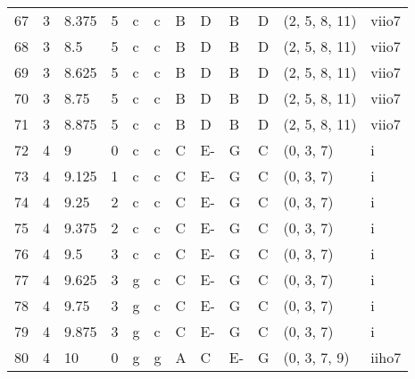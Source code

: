 \begin{tabular}{llllllllllll}
67  & 3       & 8.375  & 5               & c          & c              & B      & D       & B      & D         & (2, 5, 8, 11)    & viio7          \\
68  & 3       & 8.5    & 5               & c          & c              & B      & D       & B      & D         & (2, 5, 8, 11)    & viio7          \\
69  & 3       & 8.625  & 5               & c          & c              & B      & D       & B      & D         & (2, 5, 8, 11)    & viio7          \\
70  & 3       & 8.75   & 5               & c          & c              & B      & D       & B      & D         & (2, 5, 8, 11)    & viio7          \\
71  & 3       & 8.875  & 5               & c          & c              & B      & D       & B      & D         & (2, 5, 8, 11)    & viio7          \\
72  & 4       & 9      & 0               & c          & c              & C      & E-      & G      & C         & (0, 3, 7)        & i              \\
73  & 4       & 9.125  & 1               & c          & c              & C      & E-      & G      & C         & (0, 3, 7)        & i              \\
74  & 4       & 9.25   & 2               & c          & c              & C      & E-      & G      & C         & (0, 3, 7)        & i              \\
75  & 4       & 9.375  & 2               & c          & c              & C      & E-      & G      & C         & (0, 3, 7)        & i              \\
76  & 4       & 9.5    & 3               & c          & c              & C      & E-      & G      & C         & (0, 3, 7)        & i              \\
77  & 4       & 9.625  & 3               & g          & c              & C      & E-      & G      & C         & (0, 3, 7)        & i              \\
78  & 4       & 9.75   & 3               & g          & c              & C      & E-      & G      & C         & (0, 3, 7)        & i              \\
79  & 4       & 9.875  & 3               & g          & c              & C      & E-      & G      & C         & (0, 3, 7)        & i              \\
80  & 4       & 10     & 0               & g          & g              & A      & C       & E-     & G         & (0, 3, 7, 9)     & iiho7          \\

\end{tabular}

